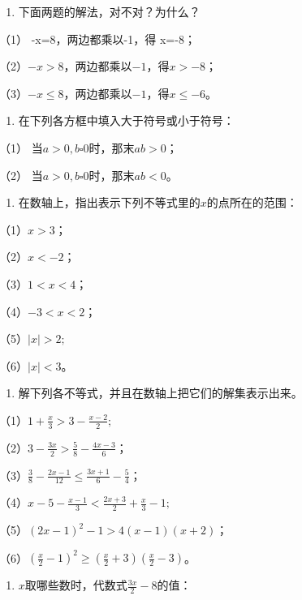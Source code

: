 \begin{enumerate}[start=3]
\item
  下面两题的解法，对不对？为什么？
\end{enumerate}

（1） -x=8，两边都乘以-1，得 x=-8；

（2）\(-x > 8\)，两边都乘以\(-1\)，得\(x > -8\)；

（3）\(-x \leqslant 8\)，两边都乘以\(-1\)，得\(x \leqslant -6\)。

\begin{enumerate}[start=4]
\item
  在下列各方框中填入大于符号或小于符号：
\end{enumerate}

（1） 当\(a > 0, b \square 0\)时，那末\(ab > 0\)；

（2） 当\(a > 0, b \square 0\)时，那末\(ab < 0\)。

\begin{enumerate}[start=5]
\item
  在数轴上，指出表示下列不等式里的\(x\)的点所在的范围：
\end{enumerate}

（1）\(x > 3\)；

（2）\(x < -2\)；

（3）\(1 < x < 4\)；

（4）\(-3 < x < 2\)；

（5）\(|x| > 2;\)

（6）\(|x| < 3\)。

\begin{enumerate}[start=6]
\item
  解下列各不等式，并且在数轴上把它们的解集表示出来。
\end{enumerate}

（1）\(1+\frac{x}{3}>3-\frac{x-2}{2};\)

（2）\(3 - \frac{3x}{2} > \frac{5}{8} - \frac{4x - 3}{6}\)；

（3）\(\frac{3}{8} - \frac{2x - 1}{12} \leqslant \frac{3x + 1}{6} - \frac{5}{4}\)；

（4）\(x - 5 - \frac{x - 1}{3} < \frac{2x + 3}{2} + \frac{x}{3} - 1;\)

（5）\((2x - 1)^{2} - 1 > 4(x - 1)(x + 2)\)；

（6）\(\left(\frac{x}{2} - 1\right)^2 \geqslant \left(\frac{x}{2} + 3\right)\left(\frac{x}{2} - 3\right)\)。

\begin{enumerate}[start=7]
\item
  \(x\)取哪些数时，代数式\(\frac{3x}{2} - 8\)的值：
\end{enumerate}

